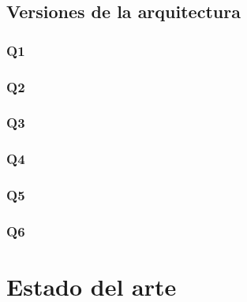 \subsection{Versiones de la arquitectura}

\subsubsection{Q1}
\subsubsection{Q2}
\subsubsection{Q3}
\subsubsection{Q4}
\subsubsection{Q5}
\subsubsection{Q6}


\section{Estado del arte}

